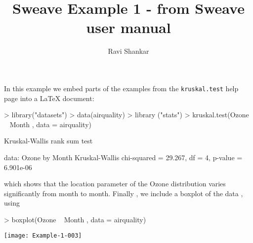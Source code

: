 \documentclass[a4paper ]{ article}
\title{Sweave  Example  1 - from Sweave user manual}
\author{Ravi Shankar}
\begin{document}

\maketitle
In this  example  we embed  parts of the  examples  from  the
\texttt{kruskal.test} help  page  into a \LaTeX {}  document:
\begin{Schunk}
\begin{Sinput}
> library("datasets")
> data(airquality)
> library ("stats")
> kruskal.test(Ozone ~ Month , data = airquality)
\end{Sinput}
\begin{Soutput}
	Kruskal-Wallis rank sum test

data:  Ozone by Month
Kruskal-Wallis chi-squared = 29.267, df = 4, p-value = 6.901e-06
\end{Soutput}
\end{Schunk}
which  shows  that  the  location  parameter  of the  Ozone
distribution  varies  significantly  from  month to month. Finally , we
include a boxplot  of the data , using
\begin{Schunk}
\begin{Sinput}
> boxplot(Ozone ~ Month , data = airquality)
\end{Sinput}
\end{Schunk}
\begin{center}
\texttt{[image: Example-1-003]}
\end{center}
\end{document}
